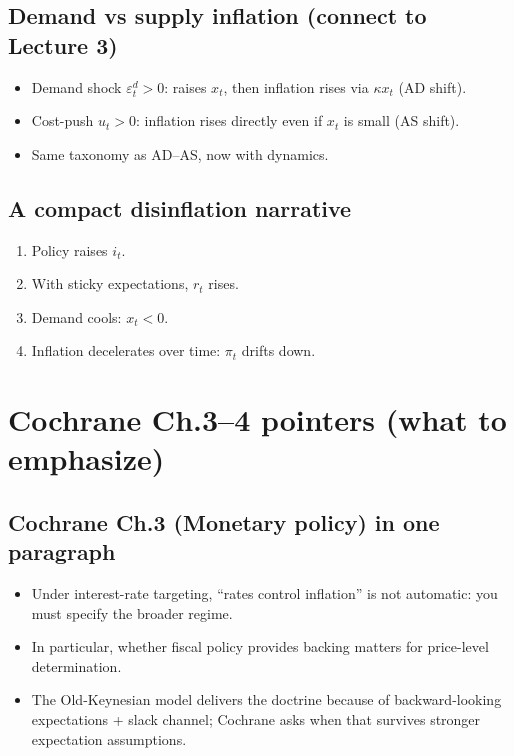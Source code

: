 \documentclass[11pt]{article}
\begin{document}
\subsection*{Demand vs supply inflation (connect to Lecture 3)}
\begin{itemize}
\item Demand shock $\varepsilon_t^{d}>0$: raises $x_t$, then inflation rises via $\kappa x_t$ (AD shift).
\item Cost-push $u_t>0$: inflation rises directly even if $x_t$ is small (AS shift).
\item Same taxonomy as AD--AS, now with dynamics.
\end{itemize}

\subsection*{A compact disinflation narrative}
\begin{enumerate}
\item Policy raises $i_t$.
\item With sticky expectations, $r_t$ rises.
\item Demand cools: $x_t<0$.
\item Inflation decelerates over time: $\pi_t$ drifts down.
\end{enumerate}

\section{Cochrane Ch.3--4 pointers (what to emphasize)}

\subsection*{Cochrane Ch.3 (Monetary policy) in one paragraph}
\begin{itemize}
\item Under interest-rate targeting, ``rates control inflation'' is not automatic: you must specify the broader regime.
\item In particular, whether fiscal policy provides backing matters for price-level determination.
\item The Old-Keynesian model delivers the doctrine because of backward-looking expectations + slack channel; Cochrane asks when that survives stronger expectation assumptions.
\end{itemize}
\end{document}
